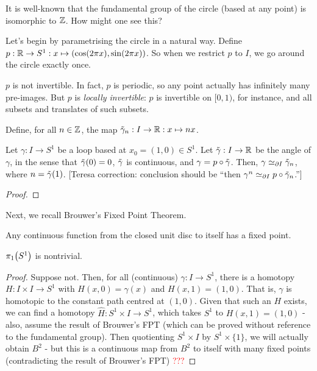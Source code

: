 It is well-known that the fundamental group of the circle (based at any point) is isomorphic to $\mathbb{Z}$. How might one see this?

Let's begin by parametrising the circle in a natural way. Define $p : \mathbb{R} \to S^1 : x \mapsto \left( \cos\!{\left( 2\pi x \right)}, \sin\!{\left( 2\pi x \right)} \right)$. So when we restrict $p$ to $I$, we go around the circle exactly once.

$p$ is not invertible. In fact, $p$ is periodic, so any point actually has infinitely many pre-images. But $p$ is \textit{locally invertible}: $p$ is invertible on $[0, 1)$, for instance, and all subsets and translates of such subsets. 

Define, for all $n \in \mathbb{Z}$, the map $\Tilde{\gamma}_n : I \to \mathbb{R} : x \mapsto nx$.

\begin{boxlemma}
    Let $\gamma : I \to S^1$ be a loop based at $x_0 = (1, 0) \in S^1$. Let $\Tilde{\gamma} : I \to \mathbb{R}$ be the angle of $\gamma$, in the sense that $\Tilde{\gamma}(0) = 0$, $\Tilde{\gamma}$ is continuous, and $\gamma = p \circ \Tilde{\gamma}$. Then, $\gamma \simeq_{\partial I} \Tilde{\gamma}_n$, where $n = \Tilde{\gamma}(1)$. [Teresa correction: conclusion should be ``then $\gamma^n\simeq_{\partial I} p\circ \tilde{\gamma}_n$.'']
\end{boxlemma}
\begin{proof}
    \sorry
\end{proof}

Next, we recall Brouwer's Fixed Point Theorem.
\begin{boxtheorem}
    Any continuous function from the closed unit disc to itself has a fixed point.
\end{boxtheorem}

\begin{boxlemma}
    $\pi_1\!\left( S^1 \right)$ is nontrivial.
\end{boxlemma}
\begin{proof}
    Suppose not. Then, for all (continuous) $\gamma : I \to S^1$, there is a homotopy $H : I \times I \to S^1$ with $H(x, 0) = \gamma(x)$ and $H(x, 1) = (1, 0)$. That is, $\gamma$ is homotopic to the constant path centred at $(1, 0)$. Given that such an $H$ exists, we can find a homotopy $\hat{H}:S^1\times I \rightarrow S^1$, which takes $S^1$ to $H(x,1)=(1,0)$ - also, assume the result of Brouwer's FPT (which can be proved without reference to the fundamental group). Then quotienting $S^1\times I$ by $S^1\times \{1\}$, we will actually obtain $B^2$ - but this is a continuous map from $B^2$ to itself with many fixed points (contradicting the result of Brouwer's FPT) \textcolor{red}{???}
\end{proof}

